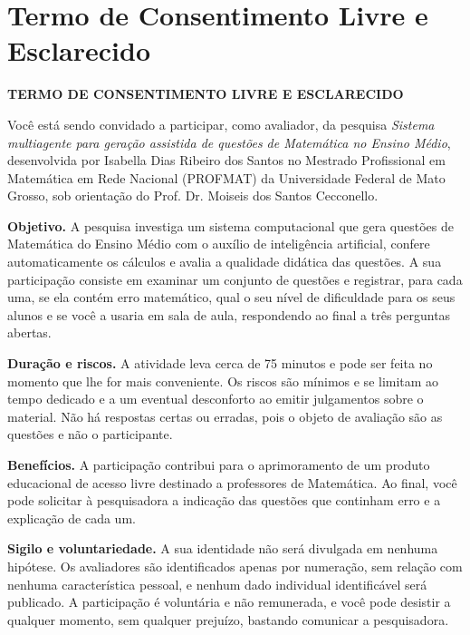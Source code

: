 \chapter{Termo de Consentimento Livre e Esclarecido}
\label{ap:tcle}


\begin{center}
\textbf{TERMO DE CONSENTIMENTO LIVRE E ESCLARECIDO}
\end{center}

Você está sendo convidado a participar, como avaliador, da pesquisa \emph{Sistema multiagente para
geração assistida de questões de Matemática no Ensino Médio}, desenvolvida por Isabella Dias
Ribeiro dos Santos no Mestrado Profissional em Matemática em Rede Nacional (PROFMAT) da Universidade
Federal de Mato Grosso, sob orientação do Prof. Dr. Moiseis dos Santos Cecconello.

\textbf{Objetivo.} A pesquisa investiga um sistema computacional que gera questões de Matemática
do Ensino Médio com o auxílio de inteligência artificial, confere automaticamente os cálculos e
avalia a qualidade didática das questões. A sua participação consiste em examinar um conjunto de
questões e registrar, para cada uma, se ela contém erro matemático, qual o seu nível de dificuldade
para os seus alunos e se você a usaria em sala de aula, respondendo ao final a três perguntas
abertas.

\textbf{Duração e riscos.} A atividade leva cerca de 75 minutos e pode ser feita no momento que
lhe for mais conveniente. Os riscos são mínimos e se limitam ao tempo dedicado e a um eventual
desconforto ao emitir julgamentos sobre o material. Não há respostas certas ou erradas, pois o
objeto de avaliação são as questões e não o participante.

\textbf{Benefícios.} A participação contribui para o aprimoramento de um produto educacional de
acesso livre destinado a professores de Matemática. Ao final, você pode solicitar à pesquisadora a
indicação das questões que continham erro e a explicação de cada um.

\textbf{Sigilo e voluntariedade.} A sua identidade não será divulgada em nenhuma hipótese. Os
avaliadores são identificados apenas por numeração, sem relação com nenhuma característica pessoal,
e nenhum dado individual identificável será publicado. A participação é voluntária e não
remunerada, e você pode desistir a qualquer momento, sem qualquer prejuízo, bastando comunicar a
pesquisadora.

